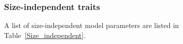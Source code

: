 \documentclass[gmd, manuscript]{copernicus}
\begin{document}
{%

\subsubsection{Size-independent traits}\label{size_ind_traits}

A list of size-independent model parameters are listed in Table~\ref{Size_independent}.

}
\end{document}
